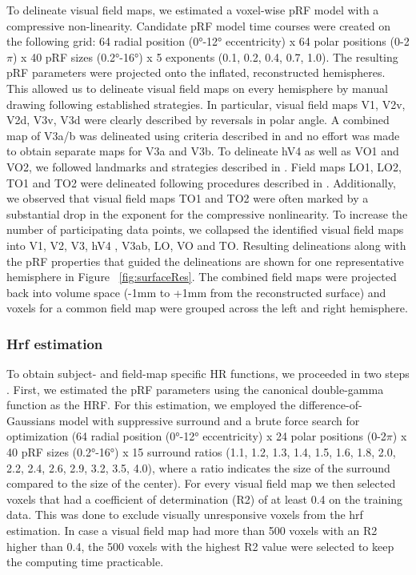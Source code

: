 To delineate visual field maps, we estimated a voxel-wise pRF model with a compressive non-linearity. Candidate pRF model time courses were created on the following grid: 64 radial position (0°-12° eccentricity) x 64 polar positions (0-2$\pi$) x 40 pRF sizes (0.2°-16°) x 5 exponents (0.1, 0.2, 0.4, 0.7, 1.0). The resulting pRF parameters were projected onto the inflated, reconstructed hemispheres. This allowed us to delineate visual field maps on every hemisphere by manual drawing following established strategies. In particular, visual field maps V1, V2v, V2d, V3v, V3d were clearly described by reversals in polar angle. A combined map of V3a/b was delineated using criteria described in \cite{Wandell2005, Larsson2006} and no effort was made to obtain separate maps for V3a and V3b. To delineate hV4 as well as VO1 and VO2, we followed landmarks and strategies described in \cite{Winawer2017}. Field maps LO1, LO2, TO1 and TO2 were delineated following procedures described in \cite{Amano2009}. Additionally, we observed that visual field maps TO1 and TO2 were often marked by a substantial drop in the exponent for the compressive nonlinearity. To increase the number of participating data points, we collapsed the identified visual field maps into V1, V2, V3, hV4 \parencite{Winawer2010}, V3ab, LO, VO and TO. Resulting delineations along with the pRF properties that guided the delineations are shown for one representative hemisphere in Figure ~\ref{fig:surfaceRes}. The combined field maps were projected back into volume space (-1mm to +1mm from the reconstructed surface) and voxels for a common field map were grouped across the left and right hemisphere.

\subsubsection{Hrf estimation}
To obtain subject- and field-map specific HR functions, we proceeded in two steps \parencite{Harvey2011, Harvey2015, Harvey2016}. First, we estimated the pRF parameters using the canonical double-gamma function \parencite{Friston1998} as the HRF. For this estimation, we employed the difference-of-Gaussians model with suppressive surround and a brute force search for optimization (64 radial position (0°-12° eccentricity) x 24 polar positions (0-2$\pi$) x 40 pRF sizes (0.2°-16°) x 15 surround ratios (1.1, 1.2, 1.3, 1.4, 1.5, 1.6, 1.8, 2.0, 2.2, 2.4, 2.6, 2.9, 3.2, 3.5, 4.0), where a ratio indicates the size of the surround compared to the size of the center). For every visual field map we then selected voxels that had a coefficient of determination (R2) of at least 0.4 on the training data. This was done to exclude visually unresponsive voxels from the hrf estimation. In case a visual field map had more than 500 voxels with an R2 higher than 0.4, the 500 voxels with the highest R2 value were selected to keep the computing time practicable.


